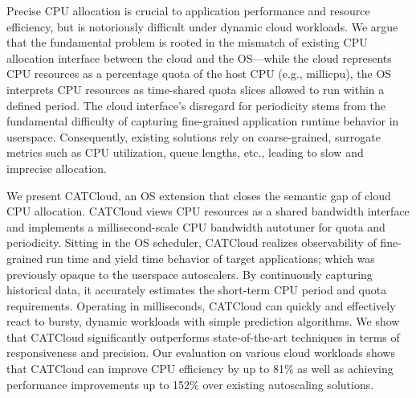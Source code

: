 Precise CPU allocation is crucial to application performance and resource efficiency, but is notoriously difficult under dynamic cloud workloads. We argue that the fundamental problem is rooted in the mismatch of existing CPU allocation interface between the cloud and the OS---while the cloud represents CPU resources as a percentage quota of the host CPU (e.g., millicpu), the OS interprets CPU resources as time-shared quota slices allowed to run within a defined period. The cloud interface's disregard for periodicity stems from the fundamental difficulty of capturing fine-grained application runtime behavior in userspace. Consequently, existing solutions rely on coarse-grained, surrogate metrics such as CPU utilization, queue lengths, etc., leading to slow and imprecise allocation.

We present CATCloud, an OS extension that closes the semantic gap of cloud CPU allocation. CATCloud views CPU resources as a shared bandwidth interface and implements a millisecond-scale CPU bandwidth autotuner for quota and periodicity. Sitting in the OS scheduler, CATCloud realizes observability of fine-grained run time and yield time behavior of target applications; which was previously opaque to the userspace autoscalers. By continuously capturing historical data, it accurately estimates the short-term CPU period and quota requirements. Operating in milliseconds, CATCloud can quickly and effectively react to bursty, dynamic workloads with simple prediction algorithms. We show that CATCloud significantly outperforms state-of-the-art techniques in terms of responsiveness and precision. Our evaluation on various cloud workloads shows that CATCloud can improve CPU efficiency by up to 81\% as well as achieving performance improvements up to 152\% over existing autoscaling solutions.